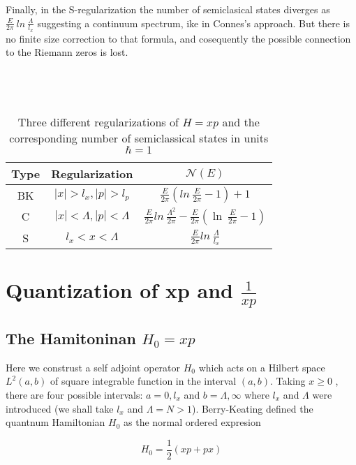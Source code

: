 \documentclass[12pt, letterpaper]{article}
\newcommand*{\1}{\hspace{1pt}}
\begin{document}
    Finally, in the S-regularization the number of semiclasical states diverges as $\frac{E}{2\pi} \ ln \ \frac{\Lambda}{l_{x}}$ suggesting a continuum spectrum, ike in 
    Connes's approach. But there is no finite size correction to that formula, and cosequently the possible connection to the Riemann zeros is lost. \\ 
    \\ 
    \\


    \begin{longtable}[c]{c c c }
        \caption{\\Three different regularizations of $H=xp$ and the corresponding number of semiclassical states in units $\hbar=1$\cite{s7} }\\
        \hline
         Type & Regularization & $\mathcal{N}(E)$\\
         \hline 
         BK & $|x| > l_{x}, |p| > l_{p}$ & $\frac{E}{2\pi}\left(ln \ \frac{E}{2\pi}-1\right)+1$  \\  
         C & $|x| < \Lambda, |p| < \Lambda$ & $\frac{E}{2\pi}ln \ \frac{\Lambda^{2}}{2\pi} - \frac{E}{2\pi}\left(\ln \ \frac{E}{2\pi}-1\right)$   \\ 
         S & $l_{x} < x < \Lambda$ & $\frac{E}{2\pi}ln \ \frac{\Lambda}{l_{x}}$   \\ 
        \hline
    \end{longtable}
    \section{Quantization of xp and $\frac{1}{xp}$}
    
    
    \subsection{The Hamitoninan $H_{0} = xp$}

        Here we construst a self adjoint operator $H_{0}$ which acts on a Hilbert space $L^{2}(a,b)$ of square integrable function in the interval $(a,b)$. Taking $x\geqslant 0$
        , there are four possible intervals: $a=0,l_{x}$ and $b=\Lambda, \infty $ where $l_{x}$ and $\Lambda$ were introduced (we shall take $l_{x}$ and $\Lambda = N > 1$).
        Berry-Keating defined the quantnum Hamiltonian $H_{0}$ as the normal ordered expresion 

        \begin{equation}
            H_{0} = \frac{1}{2}(xp + px)
        \end{equation}
\end{document}

